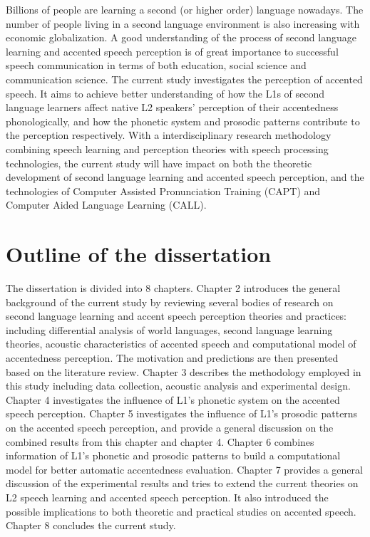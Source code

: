 Billions of people are learning a second (or higher order) language nowadays. The number of people living in a second language environment is also increasing with economic globalization. A good understanding of the process of second language learning and accented speech perception is of great importance to successful speech communication in terms of both education, social science and communication science. The current study investigates the perception of accented speech. It aims to achieve better understanding of how the L1s of second language learners affect native L2 speakers' perception of their accentedness phonologically, and how the phonetic system and prosodic patterns contribute to the perception respectively. With a interdisciplinary research methodology combining speech learning and perception theories with speech processing technologies, the current study will have impact on both the theoretic development of second language learning and accented speech perception, and the technologies of Computer Assisted Pronunciation Training (CAPT) and Computer Aided Language Learning (CALL).

\section{Outline of the dissertation}

The dissertation is divided into 8 chapters. Chapter 2 introduces the general background of the current study by reviewing several bodies of research on second language learning and accent speech perception theories and practices: including differential analysis of world languages, second language learning theories, acoustic characteristics of accented speech and computational model of accentedness perception. The motivation and predictions are then presented based on the literature review. Chapter 3 describes the methodology employed in this study including data collection, acoustic analysis and experimental design. Chapter 4 investigates the influence of L1's phonetic system on the accented speech perception. Chapter 5 investigates the influence of L1's prosodic patterns on the accented speech perception, and provide a general discussion on the combined results from this chapter and chapter 4. Chapter 6 combines information of L1's phonetic and prosodic patterns to build a computational model for better automatic accentedness evaluation. Chapter 7 provides a general discussion of the experimental results and tries to extend the current theories on L2 speech learning and accented speech perception. It also introduced the possible implications to both theoretic and practical studies on accented speech. Chapter 8 concludes the current study.



